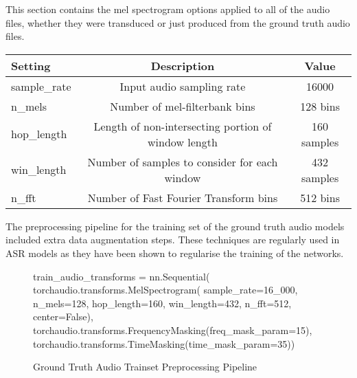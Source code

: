 This section contains the mel spectrogram options applied to all of the audio files,
whether they were transduced or just produced from the ground truth audio files.

{\small\begin{center}
    \begin{tabular} { | l | c | c | }
        \hline
        Setting & Description & Value \\
        \hline
        sample\_rate & Input audio sampling rate & 16000 \\
        n\_mels & Number of mel-filterbank bins & 128 bins \\
        hop\_length & Length of non-intersecting portion of window length & 160 samples \\
        win\_length & Number of samples to consider for each window & 432 samples \\
        n\_fft & Number of Fast Fourier Transform bins & 512 bins \\
        \hline
    \end{tabular}
\end{center}}

The preprocessing pipeline for the training set of the ground truth audio models
included extra data augmentation steps. These techniques are regularly used in ASR
models as they have been shown to regularise the training of the networks.

\begin{figure}[hbtp]
    \caption{Ground Truth Audio Trainset Preprocessing Pipeline}
    \begin{python}
    train_audio_transforms = nn.Sequential(
        torchaudio.transforms.MelSpectrogram(
            sample_rate=16_000,
            n_mels=128,
            hop_length=160,
            win_length=432,
            n_fft=512,
            center=False),
        torchaudio.transforms.FrequencyMasking(freq_mask_param=15),
        torchaudio.transforms.TimeMasking(time_mask_param=35))
    \end{python}
\end{figure}